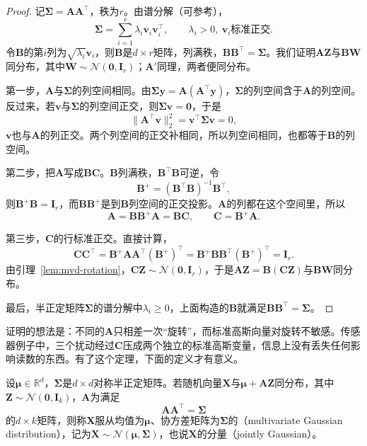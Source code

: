 \begin{proof}
记$\bm{\Sigma}=\bm{A}\bm{A}^{\top}$，秩为$r$。由谱分解（可参考），
\[
 \bm{\Sigma}=\sum_{i=1}^{r}\lambda_i\bm{v}_i\bm{v}_i^{\top},\qquad \lambda_i>0,\ \bm{v}_i\text{标准正交} .
\]
令$\bm{B}$的第$i$列为$\sqrt{\lambda_i}\bm{v}_i$，则$\bm{B}$是$d\times r$矩阵，列满秩，$\bm{B}\bm{B}^{\top}=\bm{\Sigma}$。我们证明$\bm{A}\bm{Z}$与$\bm{B}\bm{W}$同分布，其中$\bm{W}\sim\mathcal{N}(\bm{0},\bm{I}_r)$；$\bm{A}'$同理，两者便同分布。

第一步，$\bm{A}$与$\bm{\Sigma}$的列空间相同。由$\bm{\Sigma}\bm{y}=\bm{A}(\bm{A}^{\top}\bm{y})$，$\bm{\Sigma}$的列空间含于$\bm{A}$的列空间。反过来，若$\bm{v}$与$\bm{\Sigma}$的列空间正交，则$\bm{\Sigma}\bm{v}=\bm{0}$，于是
\[
 \lVert\bm{A}^{\top}\bm{v}\rVert_2^{2}=\bm{v}^{\top}\bm{\Sigma}\bm{v}=0 ,
\]
$\bm{v}$也与$\bm{A}$的列正交。两个列空间的正交补相同，所以列空间相同，也都等于$\bm{B}$的列空间。

第二步，把$\bm{A}$写成$\bm{B}\bm{C}$。$\bm{B}$列满秩，$\bm{B}^{\top}\bm{B}$可逆，令
\[
 \bm{B}^{+}=(\bm{B}^{\top}\bm{B})^{-1}\bm{B}^{\top} ,
\]
则$\bm{B}^{+}\bm{B}=\bm{I}_r$，而$\bm{B}\bm{B}^{+}$是到$\bm{B}$列空间的正交投影。$\bm{A}$的列都在这个空间里，所以
\[
 \bm{A}=\bm{B}\bm{B}^{+}\bm{A}=\bm{B}\bm{C},\qquad \bm{C}=\bm{B}^{+}\bm{A} .
\]

第三步，$\bm{C}$的行标准正交。直接计算，
\[
 \bm{C}\bm{C}^{\top}=\bm{B}^{+}\bm{A}\bm{A}^{\top}(\bm{B}^{+})^{\top}=\bm{B}^{+}\bm{B}\bm{B}^{\top}(\bm{B}^{+})^{\top}=\bm{I}_r .
\]
由引理~\ref{lem:mvd-rotation}，$\bm{C}\bm{Z}\sim\mathcal{N}(\bm{0},\bm{I}_r)$，于是$\bm{A}\bm{Z}=\bm{B}(\bm{C}\bm{Z})$与$\bm{B}\bm{W}$同分布。

最后，半正定矩阵$\bm{\Sigma}$的谱分解中$\lambda_i\geq0$，上面构造的$\bm{B}$就满足$\bm{B}\bm{B}^{\top}=\bm{\Sigma}$。
\end{proof}

证明的想法是：不同的$\bm{A}$只相差一次“旋转”，而标准高斯向量对旋转不敏感。传感器例子中，三个扰动经过$\bm{C}$压成两个独立的标准高斯变量，信息上没有丢失任何影响读数的东西。有了这个定理，下面的定义才有意义。

\begin{definition}[多元高斯分布]
\label{def:mvd-gaussian}
设$\bm{\mu}\in\mathbb{R}^{d}$，$\bm{\Sigma}$是$d\times d$对称半正定矩阵。若随机向量$\bm{X}$与$\bm{\mu}+\bm{A}\bm{Z}$同分布，其中$\bm{Z}\sim\mathcal{N}(\bm{0},\bm{I}_k)$，$\bm{A}$为满足
\begin{equation}
 \bm{A}\bm{A}^{\top}=\bm{\Sigma}
 \label{eq:mvd-gaussian-factor}
\end{equation}
的$d\times k$矩阵，则称$\bm{X}$服从均值为$\bm{\mu}$、协方差矩阵为$\bm{\Sigma}$的（multivariate Gaussian distribution），记为$\bm{X}\sim\mathcal{N}(\bm{\mu},\bm{\Sigma})$，也说$\bm{X}$的分量（jointly Gaussian）。
\end{definition}

